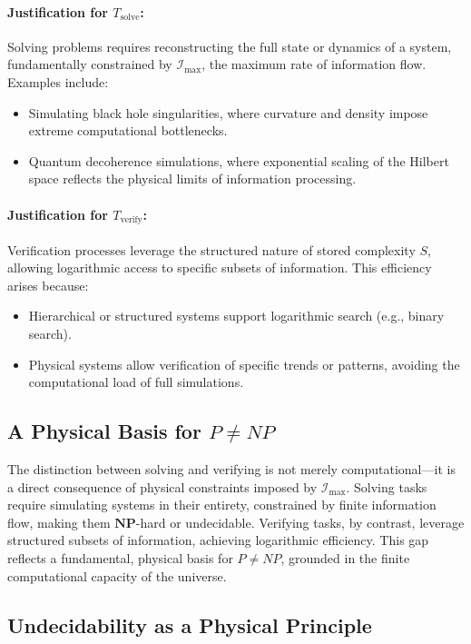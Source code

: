 \documentclass[12pt]{article}
\begin{document}
\paragraph{Justification for $T_{\text{solve}}$:}
Solving problems requires reconstructing the full state or dynamics of a system, fundamentally constrained by $\mathcal{I}_{\text{max}}$, the maximum rate of information flow. Examples include:
\begin{itemize}
    \item Simulating black hole singularities, where curvature and density impose extreme computational bottlenecks.
    \item Quantum decoherence simulations, where exponential scaling of the Hilbert space reflects the physical limits of information processing.
\end{itemize}

\paragraph{Justification for $T_{\text{verify}}$:}
Verification processes leverage the structured nature of stored complexity $S$, allowing logarithmic access to specific subsets of information. This efficiency arises because:
\begin{itemize}
    \item Hierarchical or structured systems support logarithmic search (e.g., binary search).
    \item Physical systems allow verification of specific trends or patterns, avoiding the computational load of full simulations.
\end{itemize}

\subsection{A Physical Basis for $P \neq NP$}

The distinction between solving and verifying is not merely computational—it is a direct consequence of physical constraints imposed by $\mathcal{I}_{\text{max}}$. Solving tasks require simulating systems in their entirety, constrained by finite information flow, making them $\mathbf{NP}$-hard or undecidable. Verifying tasks, by contrast, leverage structured subsets of information, achieving logarithmic efficiency. This gap reflects a fundamental, physical basis for $P \neq NP$, grounded in the finite computational capacity of the universe.

\subsection{Undecidability as a Physical Principle}
\end{document}
